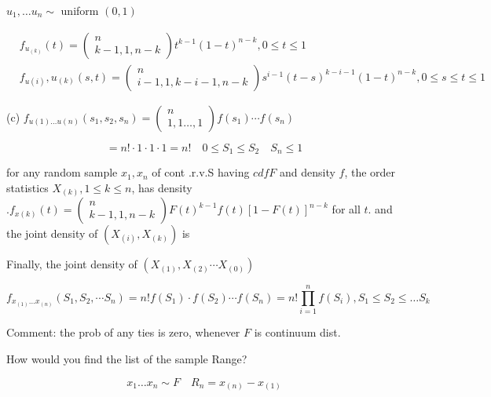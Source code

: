 \documentclass[10pt]{article}
\begin{document}
$u_{1}, \ldots u_{n} \sim $ uniform $(0,1)$

$$
\begin{aligned}
& f_{u_{(k)}}(t)=\left(\begin{array}{c}
n \\
k-1,1, n-k
\end{array}\right) t^{k-1}(1-t)^{n-k}, 0 \leq t \leq 1 \\
& f_{u(i)}, u_{(k)}(s, t)=\left(\begin{array}{l}
n \\
i-1,1, k-i-1,n-k
\end{array}\right) s^{i-1}(t-s)^{k-i-1}(1-t)^{n-k}, 0 \leq s \leq t \leq 1
\end{aligned}
$$

(c) $f_{u(1) \ldots u(n)}\left(s_{1}, s_{2}, s_{n}\right)=\left(\begin{array}{l}
    n \\
    1,1 \ldots  ,1
    \end{array}\right) f\left(s_{1}\right) \cdots f\left(s_{n}\right)$

$$
=n ! \cdot 1 \cdot 1 \cdot 1=n ! \quad 0 \leqslant S_{1} \leq S_2 \quad S_{n} \leqslant 1
$$

\begin{theorem}
for any random sample $x_{1}, x_{n}$ of cont .r.v.S having $c d f F$ and density $f$, the order statistics $X_{(k)}, 
1 \leq k \leq n$, has density $.f_{x(k)}(t)=\left(\begin{array}{l}
    n \\
    k-1,1,n-k
    \end{array}\right) F(t)^{k-1} f(t)[1-F(t)]^{n-k}$ 
for all $t$. and the joint density of $\left(X_{(i)}, X_{(k)}\right)$ is

Finally, the joint density of $\left(X_{(1)}, X_{(2)} \cdots X_{(0)}\right)$
    
    $$
    f_{x_{(1)} \ldots x_{(n)}}\left(S_{1}, S_{2}, \cdots S_{n}\right)=n ! f\left(S_{1}\right) 
    \cdot f\left(S_{2}\right) \cdots f\left(S_{n}\right)=n ! \prod_{i=1}^{n} f\left(S_{i}\right), 
    S_{1}\leq S_{2}\leq \ldots S_{k}
    $$
    
\end{theorem}
Comment: the prob of any ties is zero, whenever $F$ is continuum dist. 
\begin{example}
    How would you find the list of the sample Range?
\end{example}

$$
x_{1}\ldots x_{n} \sim   F \quad R_{n}=x_{(n)}-x_{(1)}
$$
\end{document}
